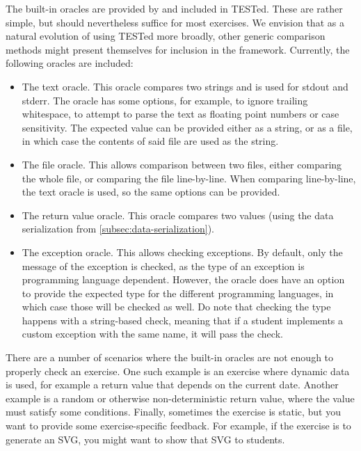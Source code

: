 \documentclass[../main]{subfiles}
\begin{document}
The built-in oracles are provided by and included in TESTed.
These are rather simple, but should nevertheless suffice for most exercises.
We envision that as a natural evolution of using TESTed more broadly, other generic comparison methods might present themselves for inclusion in the framework.
Currently, the following oracles are included:

\begin{itemize}
    \item The text oracle.
          This oracle compares two strings and is used for stdout and stderr.
          The oracle has some options, for example, to ignore trailing whitespace, to attempt to parse the text as floating point numbers or case sensitivity.
          The expected value can be provided either as a string, or as a file, in which case the contents of said file are used as the string.
    \item The file oracle.
          This allows comparison between two files, either comparing the whole file, or comparing the file line-by-line.
          When comparing line-by-line, the text oracle is used, so the same options can be provided.
    \item The return value oracle.
          This oracle compares two values (using the data serialization from \vref{subsec:data-serialization}).
    \item The exception oracle.
          This allows checking exceptions.
          By default, only the message of the exception is checked, as the type of an exception is programming language dependent.
          However, the oracle does have an option to provide the expected type for the different programming languages, in which case those will be checked as well.
          Do note that checking the type happens with a string-based check, meaning that if a student implements a custom exception with the same name, it will pass the check.
\end{itemize}

There are a number of scenarios where the built-in oracles are not enough to properly check an exercise.
One such example is an exercise where dynamic data is used, for example a return value that depends on the current date.
Another example is a random or otherwise non-deterministic return value, where the value must satisfy some conditions.
Finally, sometimes the exercise is static, but you want to provide some exercise-specific feedback.
For example, if the exercise is to generate an SVG, you might want to show that SVG to students.
\end{document}
